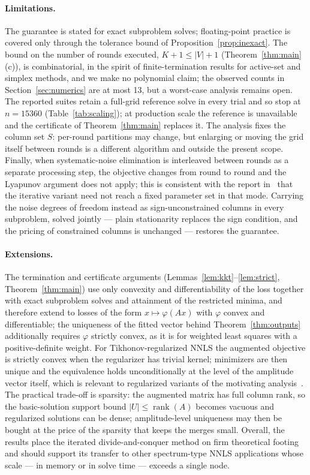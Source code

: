 \documentclass[pdflatex,sn-mathphys-num]{sn-jnl}
\theoremstyle{thmstyleone}
\theoremstyle{thmstyletwo}
\begin{document}
\paragraph{Limitations.}
The guarantee is stated for exact subproblem solves; floating-point
practice is covered only through the tolerance bound of
Proposition~\ref{prop:inexact}. The bound on the number of rounds
executed, $K{+}1\le|V|{+}1$ (Theorem~\ref{thm:main}(c)), is
combinatorial, in the spirit of finite-termination results for
active-set and simplex methods, and we make no polynomial claim; the
observed counts in Section~\ref{sec:numerics} are at most 13, but a
worst-case analysis remains open. The reported suites retain a full-grid
reference solve in every trial and so stop at $n=15360$
(Table~\ref{tab:scaling}); at production scale the reference is
unavailable and the certificate of Theorem~\ref{thm:main} replaces it. The analysis fixes the column set
$S$: per-round partitions may change, but enlarging or moving the grid
itself between rounds is a different algorithm and outside the present
scope. Finally,
when systematic-noise elimination is interleaved between rounds as a
separate processing step, the objective changes from round to round and
the Lyapunov argument does not apply; this is consistent with the
report in~\cite{brookes2006} that the iterative variant need not reach
a fixed parameter set in that mode. Carrying the noise degrees of
freedom instead as sign-unconstrained columns in every subproblem,
solved jointly --- plain stationarity replaces the sign condition, and
the pricing of constrained columns is unchanged --- restores the
guarantee.

\paragraph{Extensions.}
The termination and certificate arguments
(Lemmas~\ref{lem:kkt}--\ref{lem:strict}, Theorem~\ref{thm:main}) use
only convexity and differentiability of the loss together with exact
subproblem solves and attainment of the restricted minima, and
therefore extend to losses of the form $x\mapsto\varphi(Ax)$ with
$\varphi$ convex and differentiable; the uniqueness of the fitted
vector behind Theorem~\ref{thm:outputs} additionally requires
$\varphi$ strictly convex, as it is for weighted least squares with a
positive-definite weight. For
Tikhonov-regularized NNLS the augmented objective is strictly convex
when the regularizer has trivial kernel; minimizers are then unique and
the equivalence holds unconditionally at the level of the amplitude
vector itself, which is relevant to regularized variants of the
motivating analysis~\cite{brookes2010}. The practical trade-off is
sparsity: the augmented matrix has full column rank, so the
basic-solution support bound $|U|\le\operatorname{rank}(A)$ becomes
vacuous and regularized solutions can be dense; amplitude-level
uniqueness may then be bought at the price of the sparsity that keeps
the merges small. Overall, the
results place the iterated divide-and-conquer method on firm
theoretical footing and should support its transfer to other spectrum-type NNLS
applications whose scale --- in memory or in solve time --- exceeds a
single node.
\end{document}
